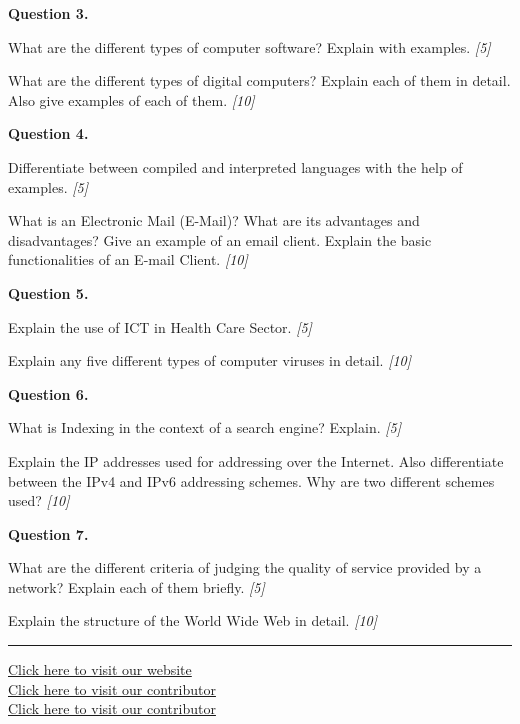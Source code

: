 \documentclass[11pt,a4paper]{article}
\newcommand{\pts}[1]{\hfill   \textit{[#1]}}
\begin{document}
\medskip


\noindent   \textbf{Question 3.}

\begin{parts}
  \item What are the different types of computer software? Explain with examples. \pts{5}
  \item What are the different types of digital computers? Explain each of them in detail. Also give examples of each of them. \pts{10}
\end{parts}

\medskip


\noindent   \textbf{Question 4.}

\begin{parts}
  \item Differentiate between compiled and interpreted languages with the help of examples. \pts{5}
  \item What is an Electronic Mail (E-Mail)? What are its advantages and disadvantages? Give an example of an email client. Explain the basic functionalities of an E-mail Client. \pts{10}
\end{parts}

\medskip


\noindent   \textbf{Question 5.}

\begin{parts}
  \item Explain the use of ICT in Health Care Sector. \pts{5}
  \item Explain any five different types of computer viruses in detail. \pts{10}
\end{parts}

\medskip


\noindent   \textbf{Question 6.}

\begin{parts}
  \item What is Indexing in the context of a search engine? Explain. \pts{5}
  \item Explain the IP addresses used for addressing over the Internet. Also differentiate between the IPv4 and IPv6 addressing schemes. Why are two different schemes used? \pts{10}
\end{parts}

\medskip


\noindent   \textbf{Question 7.}

\begin{parts}
  \item What are the different criteria of judging the quality of service provided by a network? Explain each of them briefly. \pts{5}
  \item Explain the structure of the World Wide Web in detail. \pts{10}
\end{parts}

\vfill
\rule{\linewidth}{0.4pt}

\begin{center}\small
\href{https://bhu-exam.vercel.app/}{Click here to visit our website}\\[4pt]\href{https://me-aryan.vercel.app/}{Click here to visit our contributor}\\[4pt]\href{https://quashan-me.vercel.app/}{Click here to visit our contributor}
\end{center}
\end{document}
